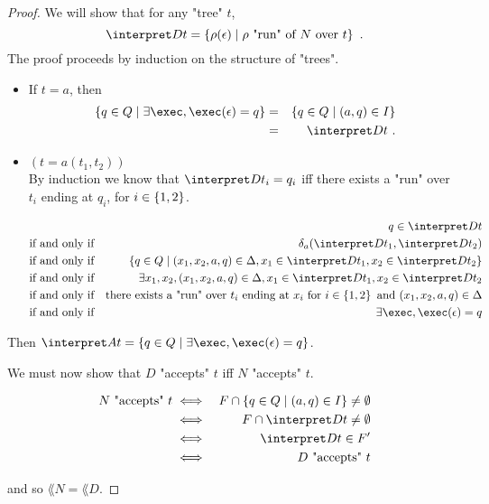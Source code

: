 \documentclass{article}
\begin{document}
\begin{proof}
	We will show that for any "tree" $t$,
	\[ 
		\interpret D t = \setdef {\rho(\epsilon)}{\text{$\rho$ "run" of~$N$ over~$t$}}\ .
	 \]
	The proof proceeds by induction on the structure of "trees".
	\begin{itemize}
		\item If $t = a$, then
		      \begin{eqnarray*}
			      \setdef {q \in Q} {\exists \exec, \exec (\epsilon) = q} &=&  \setdef {q \in Q} {(a,q) \in I} \\
			      &=& \interpret D t\ .
		      \end{eqnarray*}
		\item $(t = a(t_1,t_2))$\\
		      By induction we know that
		      $\interpret D {t_i} = q_i$ iff there exists a "run" over $t_i$ ending at $q_i$, for $i \in \left\{1,2\right\}$.

		      \begin{eqnarray*}
			      &&q \in \interpret D t \\
			      &\text{if and only if}& \delta_a (\interpret D {t_1}, \interpret D {t_2}) \\
			      &\text{if and only if}& \setdef {q \in  Q} {(x_1,x_2,a,q) \in \Delta, x_1 \in \interpret D {t_1}, x_2 \in \interpret D {t_2}} \\
			      &\text{if and only if}& \exists x_1,x_2, (x_1,x_2,a,q) \in \Delta, x_1 \in \interpret D {t_1}, x_2 \in \interpret D {t_2} \\
			      &\text{if and only if}& \text{there exists a "run" over }  t_i  \text { ending at } x_i \text { for  } i \in \set {1,2} \text{ and } (x_1,x_2,a,q) \in \Delta\\
			      &\text{if and only if}& \exists \exec, \exec (\epsilon) = q
		      \end{eqnarray*}
	\end{itemize}
	Then $ \interpret A t = \setdef {q \in Q} {\exists \exec, \exec (\epsilon) = q} $.

	We must now show that $D$ "accepts" $t$ iff $N$ "accepts" $t$.

	\begin{eqnarray*}
		N \text{ "accepts" } t &\iff& F \cap \setdef {q \in Q} {(a,q) \in I} \neq \emptyset \\
		&\iff&   F \cap  \interpret D t \neq \emptyset \\
		&\iff& \interpret D t  \in F' \\
		&\iff& D \text{ "accepts" } t
	\end{eqnarray*}

	and so $\lang N = \lang D$.

\end{proof}
\end{document}
